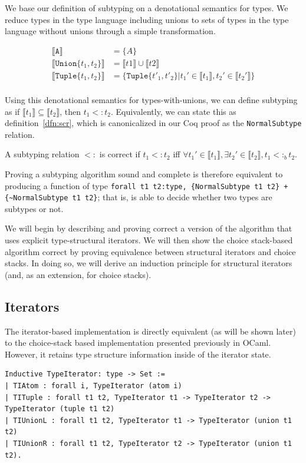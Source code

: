 \documentclass[a4paper,english]{lipics-v2019}
\newcommand{\xt}[1]{\texttt{#1}}
\newcommand{\tuplet}[2]{\xt{Tuple\{}#1,#2\xt{\}}}
\newcommand{\union}[2]{\xt{Union\{}#1,#2\xt{\}}}
\newcommand{\denotes}[1]{\llbracket #1 \rrbracket}
\newcommand{\bsub}{<:_b}
\begin{document}
We base our definition of subtyping on a denotational semantics for types. 
We reduce types in the type language including unions to sets of types
in the type language without unions through a simple transformation. 

\begin{align*}
\denotes{\xt{A}} &= \{A\} \\
\denotes{\union{t_1}{t_2}} &= \denotes{t1} \cup \denotes{t2} \\
\denotes{\tuplet{t_1}{t_2}} &= \{\tuplet{t'_1}{t'_2} | t_1' \in \denotes{t_1},  t_2' \in \denotes{t_2'}\} \\
\end{align*}

Using this denotational semantics for types-with-unions, we can define
subtyping as if $\denotes{t_1} \subseteq \denotes{t_2}$, then $t_1 <: t_2$.
Equivalently, we can state this as definition~\ref{dfn:scr}, which is canonicalized
in our Coq proof as the \verb|NormalSubtype| relation.

\begin{definition}
A subtyping relation $<:$ is correct if $t_1 <: t_2$ iff $\forall t_1' \in \denotes{t_1},
\exists t_2' \in \denotes{t_2}, t_1 \bsub t_2$.
\label{dfn:scr}
\end{definition}

Proving a subtyping algorithm sound and complete is therefore equivalent to
producing a function of type \verb|forall t1 t2:type, {NormalSubtype t1 t2} + {~NormalSubtype t1 t2}|; that is, is able to decide whether two types are
subtypes or not.

We will begin by describing and proving correct a version of the algorithm
that uses explicit type-structural iterators. We will then show the choice
stack-based algorithm correct by proving equivalence between structural
iterators and choice stacks. In doing so, we will derive an induction
principle for structural iterators (and, as an extension, for choice stacks).

\subsection{Iterators}

The iterator-based implementation is directly equivalent (as will be shown
later) to the choice-stack based implementation presented previously in OCaml.
However, it retains type structure information inside of the iterator state.

\begin{small}\begin{verbatim}
Inductive TypeIterator: type -> Set :=
| TIAtom : forall i, TypeIterator (atom i)
| TITuple : forall t1 t2, TypeIterator t1 -> TypeIterator t2 -> TypeIterator (tuple t1 t2)
| TIUnionL : forall t1 t2, TypeIterator t1 -> TypeIterator (union t1 t2)
| TIUnionR : forall t1 t2, TypeIterator t2 -> TypeIterator (union t1 t2).
\end{verbatim}\end{small}
\end{document}
